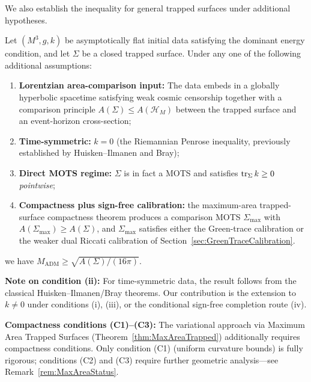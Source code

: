 We also establish the inequality for general trapped surfaces under additional hypotheses.

\begin{theorem}\label{thm:intro-conditional}
Let $(M^3, g, k)$ be asymptotically flat initial data satisfying the dominant energy condition, and let $\Sigma$ be a closed trapped surface. Under any one of the following additional assumptions:
\begin{enumerate}
    \item[(i)] \textbf{Lorentzian area-comparison input:} The data embeds in a globally hyperbolic spacetime satisfying weak cosmic censorship together with a comparison principle $A(\Sigma)\le A(\mathcal H_M)$ between the trapped surface and an event-horizon cross-section;
    \item[(ii)] \textbf{Time-symmetric:} $k = 0$ (the Riemannian Penrose inequality, previously established by Huisken--Ilmanen and Bray);
    \item[(iii)] \textbf{Direct MOTS regime:} $\Sigma$ is in fact a MOTS and satisfies $\operatorname{tr}_{\Sigma} k \ge 0$ \emph{pointwise};
    \item[(iv)] \textbf{Compactness plus sign-free calibration:} the maximum-area trapped-surface compactness theorem produces a comparison MOTS \(\Sigma_{\max}\) with \(A(\Sigma_{\max})\ge A(\Sigma)\), and \(\Sigma_{\max}\) satisfies either the Green-trace calibration or the weaker dual Riccati calibration of Section~\ref{sec:GreenTraceCalibration}.
\end{enumerate}
we have $M_{\mathrm{ADM}} \geq \sqrt{A(\Sigma)/(16\pi)}$.

\textbf{Note on condition (ii):} For time-symmetric data, the result follows from the classical Huisken--Ilmanen/Bray theorems. Our contribution is the extension to $k \neq 0$ under conditions (i), (iii), or the conditional sign-free completion route (iv).

\textbf{Compactness conditions (C1)--(C3):} The variational approach via Maximum Area Trapped Surfaces (Theorem~\ref{thm:MaxAreaTrapped}) additionally requires compactness conditions. Only condition (C1) (uniform curvature bounds) is fully rigorous; conditions (C2) and (C3) require further geometric analysis---see Remark~\ref{rem:MaxAreaStatus}.
\end{theorem}

